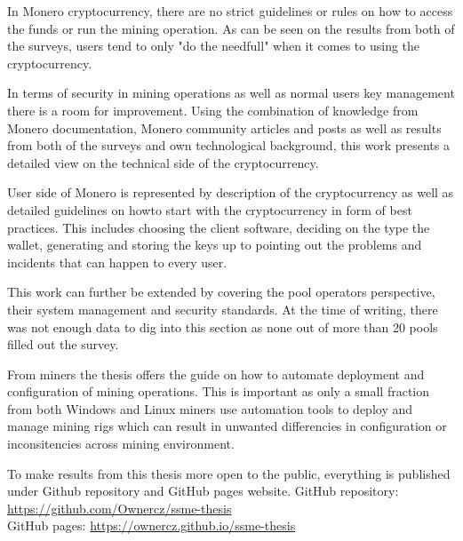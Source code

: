 \documentclass[
  printed, %
  table,   %
  lof,     %
  lot,     %
           oneside, color
]{fithesis3}
\begin{document}
In Monero cryptocurrency, there are no strict guidelines or rules on how to access the funds or run the mining operation. As can be seen on the results from both of the surveys, users tend to only "do the needfull" when it comes to using the cryptocurrency.


In terms of security in mining operations as well as normal users key management there is a room for improvement. Using the combination of knowledge from  Monero documentation, Monero community articles and posts as well as results from both of the surveys and own technological background, this work presents a detailed view on the technical side of the cryptocurrency.

User side of Monero is represented by description of the cryptocurrency as well as detailed guidelines on howto start with the cryptocurrency in form of best practices. This includes choosing the client software, deciding on the type the wallet, generating and storing the keys up to pointing out the problems and incidents that can happen to every user.

This work can further be extended by covering the pool operators perspective, their system management and security standards. At the time of writing, there was not enough data to dig into this section as none out of more than 20 pools filled out the survey.

From miners the thesis offers the guide on how to automate deployment and configuration of mining operations. This is important as only a small fraction from both Windows and Linux miners use automation tools to deploy and manage mining rigs which can result in unwanted differencies in configuration or inconsitencies across mining environment.

To make results from this thesis more open to the public, everything is published under Github repository and GitHub pages website.
\noindent
GitHub repository: \url{https://github.com/Ownercz/ssme-thesis}\\
GitHub pages: \url{https://ownercz.github.io/ssme-thesis}



\setlength{\emergencystretch}{3em}
\printbibliography[heading=bibintoc]
\let\cleardoublepage\clearpage
\begingroup
\let\cleardoublepage\clearpage
\appendix
\end{document}
